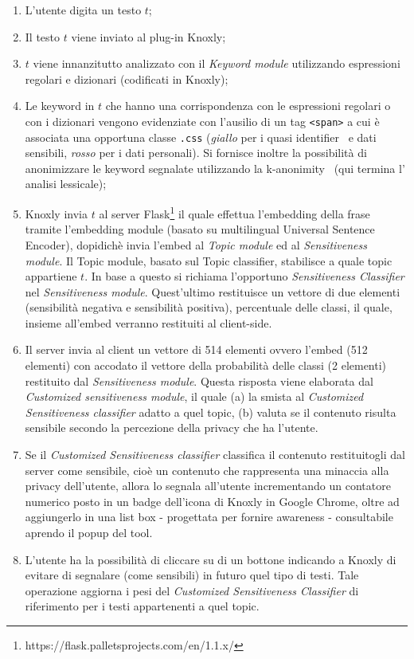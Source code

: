 \begin{enumerate}
    \item L'utente digita un testo $t$;
    \item Il testo $t$ viene inviato al plug-in Knoxly;
    \item $t$ viene innanzitutto analizzato con il \textit{Keyword module} utilizzando espressioni regolari e dizionari (codificati in Knoxly);
    \item Le keyword in $t$ che hanno una corrispondenza con le espressioni regolari o con i dizionari vengono evidenziate con l'ausilio di un tag {\tt <span>} a cui è associata una opportuna classe {\tt .css} (\textit{giallo} per i quasi identifier~\cite{quasiID} e dati sensibili, \textit{rosso} per i dati personali). Si fornisce inoltre la possibilità di anonimizzare le keyword segnalate utilizzando la k-anonimity~\cite{kAnonimity} (qui termina l' analisi lessicale);
    \item Knoxly invia $t$ al server Flask\footnote{https://flask.palletsprojects.com/en/1.1.x/} il quale effettua l'embedding della frase tramite l'embedding module (basato su multilingual Universal Sentence Encoder), dopidichè invia l'embed al \textit{Topic module} ed al \textit{Sensitiveness module}. Il Topic module, basato sul Topic classifier, stabilisce a quale topic appartiene $t$. In base a questo si richiama l'opportuno \textit{Sensitiveness Classifier} nel \textit{Sensitiveness module}. Quest'ultimo restituisce un vettore di due elementi (sensibilità negativa e sensibilità positiva), percentuale delle classi,  il quale, insieme all'embed verranno restituiti al client-side.
    \item Il server invia al client un vettore di 514 elementi ovvero l'embed (512 elementi) con accodato il vettore della probabilità delle classi (2 elementi) restituito dal \textit{Sensitiveness module}. Questa risposta viene elaborata dal \textit{Customized sensitiveness module}, il quale (a) la smista al \textit{Customized Sensitiveness classifier} adatto a quel topic, (b) valuta se il contenuto risulta sensibile secondo la percezione della privacy che ha l'utente.
    \item Se il \textit{Customized Sensitiveness classifier} classifica il contenuto restituitogli dal server come sensibile, cioè un contenuto che rappresenta una minaccia alla privacy dell'utente, allora lo segnala all'utente incrementando un contatore numerico posto in un badge dell'icona di Knoxly in Google Chrome, oltre ad aggiungerlo in una list box - progettata per fornire awareness - consultabile aprendo il popup del tool.
    \item L'utente ha la possibilità di cliccare su di un bottone  indicando a Knoxly di evitare di segnalare (come sensibili) in futuro quel tipo di testi. Tale operazione aggiorna i pesi del \textit{Customized Sensitiveness Classifier} di riferimento per i testi appartenenti a quel topic.
\end{enumerate}

